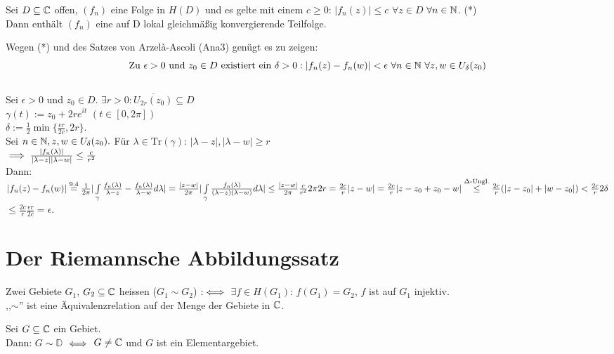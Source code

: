 \documentclass[a4paper,twoside,DIV15,BCOR12mm]{scrbook}
\def\Tr{\text{Tr}}
\def\wegint{\ensuremath{\int\limits_\gamma}}
\begin{document}
\begin{satz}
  Sei $D\subseteq \mathbb{C}$ offen, $(f_n)$ eine Folge in $H(D)$ und es gelte mit einem $c \ge 0$: $|f_n(z)|\le c$ $\forall z\in D$ $\forall n\in\mathbb{N}$. (*)\\ 
  Dann enth\"alt $(f_n)$ eine auf D lokal gleichm\"a{\ss}ig konvergierende Teilfolge.
\end{satz}
\begin{beweis}
  Wegen (*) und des Satzes von Arzel\`{a}-Ascoli (Ana3) gen\"ugt es zu zeigen:\\
  $$ \text{Zu } \epsilon>0\text{ und } z_0 \in D\text{ existiert ein } \delta > 0: |f_n(z)-f_n(w)|<\epsilon\text{ }\forall n\in\mathbb{N}\text{ }\forall z,w\in U_\delta(z_0) $$ \\
  Sei $\epsilon > 0$ und $z_0 \in D$. $\exists r > 0: \overline{U_{2r}(z_0)} \subseteq D$\\
  $\gamma(t) := z_0+2re^{it}$ $(t\in [0,2\pi])$\\
  $\delta := \frac12 \min\{\frac{\epsilon r}{2c},2r\}$.\\
  Sei $n\in\mathbb{N}, z,w\in U_\delta(z_0).$ F\"ur $\lambda \in \Tr(\gamma)$: $|\lambda-z|,|\lambda-w| \ge r$ \\
  $\implies \frac{|f_n(\lambda)|}{|\lambda-z||\lambda-w|}\le \frac{c}{r^2}$ \\
  Dann: $|f_n(z)-f_n(w)| \stackrel{\text{9.4}}{=} \frac1{2\pi} | \wegint \frac{f_n(\lambda)}{\lambda-z}-\frac{f_n(\lambda)}{\lambda-w} d\lambda |\\
  = \frac{|z-w|}{2\pi}|\wegint \frac{f_n(\lambda)}{(\lambda-z)(\lambda-w)} d\lambda | \le \frac{|z-w|}{2\pi} \frac{c}{r^2} 2\pi 2 r = \frac{2c}{r}|z-w| \\
  = \frac{2c}{r}|z-z_0+z_0-w| \stackrel{\Delta\text{-Ungl.}}{\le} \frac{2c}r (|z-z_0|+|w-z_0|) < \frac{2c}r 2\delta $\\
  
 $ \le \frac{2c}r \frac{\epsilon r}{2c} = \epsilon$.
  
\end{beweis}

\chapter{Der Riemannsche Abbildungssatz} 
\begin{definition}
  Zwei Gebiete $G_1$, $G_2\subseteq\mathbb{C}$ heissen  ($G_1 \sim G_2$) $:\iff$ $\exists f\in H(G_1)$: $f(G_1)=G_2$, $f$ ist auf $G_1$ injektiv.\\

  ,,$\sim$'' ist eine \"Aquivalenzrelation auf der Menge der Gebiete in $\mathbb{C}$.
\end{definition}
\begin{satz}

  Sei  $G\subseteq\mathbb{C}$ ein Gebiet. \\
  Dann: $G \sim \mathbb{D}$ $\iff$ $G\ne\mathbb{C}$ und $G$ ist ein Elementargebiet.
\end{satz}
\end{document}
